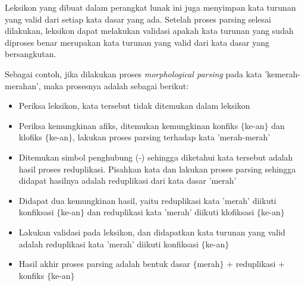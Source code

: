 Leksikon yang dibuat dalam perangkat lunak ini juga menyimpan kata turunan yang valid dari setiap kata dasar yang ada. Setelah proses parsing selesai dilakukan, leksikon dapat melakukan validasi apakah kata turunan yang sudah diproses benar merupakan kata turunan yang valid dari kata dasar yang bersangkutan. 

Sebagai contoh, jika dilakukan proses \textit{morphological parsing} pada kata 'kemerah-merahan', maka prosesnya adalah sebagai berikut:
\begin{itemize}
	\item Periksa leksikon, kata tersebut tidak ditemukan dalam leksikon
	\item Periksa kemungkinan afiks, ditemukan kemungkinan konfiks $\lbrace$ke-an$\rbrace$ dan klofiks $\lbrace$ke-an$\rbrace$, lakukan proses parsing terhadap kata 'merah-merah'
	\item Ditemukan simbol penghubung (-) sehingga diketahui kata tersebut adalah hasil proses reduplikasi. Pisahkan kata dan lakukan proses parsing sehingga didapat hasilnya adalah reduplikasi dari kata dasar 'merah'
	\item Didapat dua kemungkinan hasil, yaitu reduplikasi kata 'merah' diikuti konfiksasi $\lbrace$ke-an$\rbrace$ dan reduplikasi kata 'merah' diikuti klofiksasi $\lbrace$ke-an$\rbrace$
	\item Lakukan validasi pada leksikon, dan didapatkan kata turunan yang valid adalah reduplikasi kata 'merah' diikuti konfiksasi $\lbrace$ke-an$\rbrace$
	\item Hasil akhir proses parsing adalah bentuk dasar $\lbrace$merah$\rbrace$ + reduplikasi + konfiks $\lbrace$ke-an$\rbrace$
\end{itemize}


